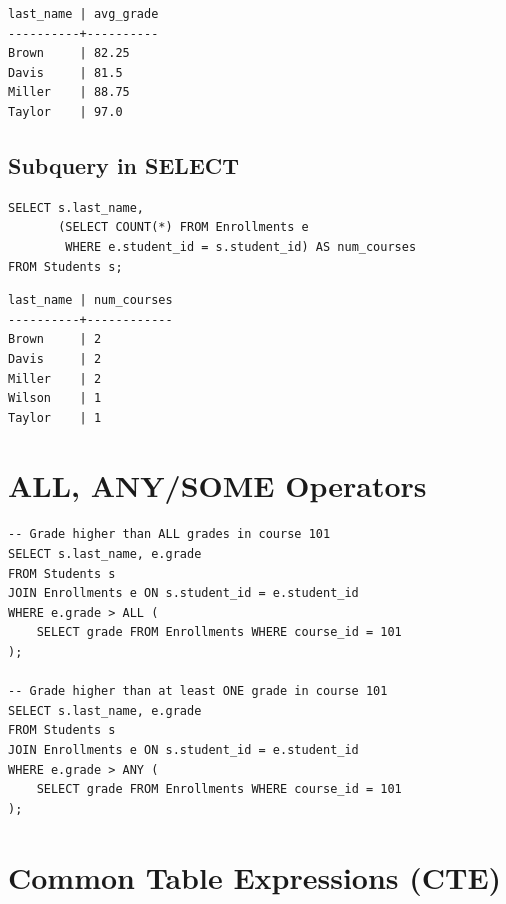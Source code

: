 \begin{codeoutput}
\begin{verbatim}
last_name | avg_grade
----------+----------
Brown     | 82.25
Davis     | 81.5
Miller    | 88.75
Taylor    | 97.0
\end{verbatim}
\end{codeoutput}

\subsection{Subquery in SELECT}

\begin{codeblock}[title=\textbf{Subquery in SELECT}]
\begin{verbatim}
SELECT s.last_name,
       (SELECT COUNT(*) FROM Enrollments e
        WHERE e.student_id = s.student_id) AS num_courses
FROM Students s;
\end{verbatim}
\end{codeblock}

\begin{codeoutput}
\begin{verbatim}
last_name | num_courses
----------+------------
Brown     | 2
Davis     | 2
Miller    | 2
Wilson    | 1
Taylor    | 1
\end{verbatim}
\end{codeoutput}

\section{ALL, ANY/SOME Operators}

\begin{codeblock}[title=\textbf{Comparison with ALL and ANY}]
\begin{verbatim}
-- Grade higher than ALL grades in course 101
SELECT s.last_name, e.grade
FROM Students s
JOIN Enrollments e ON s.student_id = e.student_id
WHERE e.grade > ALL (
    SELECT grade FROM Enrollments WHERE course_id = 101
);

-- Grade higher than at least ONE grade in course 101
SELECT s.last_name, e.grade
FROM Students s
JOIN Enrollments e ON s.student_id = e.student_id
WHERE e.grade > ANY (
    SELECT grade FROM Enrollments WHERE course_id = 101
);
\end{verbatim}
\end{codeblock}

\section{Common Table Expressions (CTE)}

